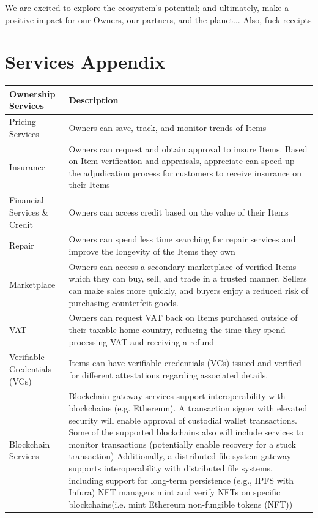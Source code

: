 \documentclass[a4paper,onecolumn, 10.5pt]{article}
\begin{document}
We are excited to explore the ecosystem’s potential; and ultimately, make a positive impact  for our Owners, our partners, and the planet...  Also, fuck receipts



\newpage
\appendix
\section{Services Appendix} \label{app: name}
 \renewcommand*{\arraystretch}{1.4}
	\begin{tabular}{|p{}|p{}|}			
	\hline
	\textbf{Ownership Services} & \textbf{Description}\\
	\hline 
	Pricing Services   & Owners can save, track, and monitor trends of Items  \\
	\hline
	Insurance & Owners can request and obtain approval to insure Items.  
		Based on Item verification and appraisals, appreciate can speed up the adjudication process for customers to receive insurance on their Items\\
		\hline
		Financial Services \& Credit & Owners can access credit based on the value of their Items \\
		\hline
		Repair & Owners can spend less time searching for repair services and improve the longevity of the Items they own \\
		\hline
		Marketplace &
		Owners can access a secondary marketplace of verified Items which they can buy, sell, and trade in a trusted manner. Sellers can make sales more quickly, and buyers enjoy a reduced risk of purchasing counterfeit goods. \\
		\hline
		VAT & Owners can request VAT back on Items purchased outside of their taxable home country, reducing the time they spend processing VAT and receiving a refund \\
		\hline
		Verifiable Credentials (VCs) &
		Items can have verifiable credentials (VCs) issued and verified for different attestations regarding associated details.  \\
		\hline
		Blockchain Services &
		Blockchain gateway services support interoperability with blockchains (e.g. Ethereum).
		A transaction signer with elevated security will enable approval of custodial wallet transactions.
		Some of the supported blockchains also will include services to monitor transactions (potentially enable recovery for a stuck transaction)
		Additionally, a distributed file system gateway supports interoperability with distributed file systems, including support for long-term persistence (e.g., IPFS with Infura)
		NFT managers mint and verify NFTs on specific blockchains(i.e. mint Ethereum non-fungible tokens (NFT)\cite{eth1155})\\
		\hline
\end{tabular}
\end{document}
